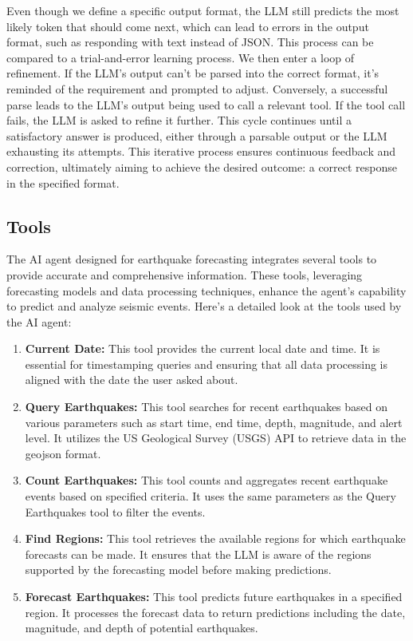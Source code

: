 Even though we define a specific output format, the LLM still predicts the most likely token that should come next, which can lead to errors in the output format, such as responding with text instead of JSON. This process can be compared to a trial-and-error learning process. We then enter a loop of refinement. If the LLM's output can't be parsed into the correct format, it's reminded of the requirement and prompted to adjust. Conversely, a successful parse leads to the LLM's output being used to call a relevant tool. If the tool call fails, the LLM is asked to refine it further. This cycle continues until a satisfactory answer is produced, either through a parsable output or the LLM exhausting its attempts. This iterative process ensures continuous feedback and correction, ultimately aiming to achieve the desired outcome: a correct response in the specified format.

\subsection{Tools}

The AI agent designed for earthquake forecasting integrates several tools to provide accurate and comprehensive information. These tools, leveraging forecasting models and data processing techniques, enhance the agent's capability to predict and analyze seismic events. Here’s a detailed look at the tools used by the AI agent:

\begin{enumerate}
    \item \textbf{Current Date:} This tool provides the current local date and time. It is essential for timestamping queries and ensuring that all data processing is aligned with the date the user asked about.
    \item \textbf{Query Earthquakes:} This tool searches for recent earthquakes based on various parameters such as start time, end time, depth, magnitude, and alert level. It utilizes the US Geological Survey (USGS) API to retrieve data in the geojson format. 
    \item \textbf{Count Earthquakes:} This tool counts and aggregates recent earthquake events based on specified criteria. It uses the same parameters as the Query Earthquakes tool to filter the events.
    \item \textbf{Find Regions:} This tool retrieves the available regions for which earthquake forecasts can be made. It ensures that the LLM is aware of the regions supported by the forecasting model before making predictions.
    \item \textbf{Forecast Earthquakes:} This tool predicts future earthquakes in a specified region. It processes the forecast data to return predictions including the date, magnitude, and depth of potential earthquakes.
\end{enumerate}

